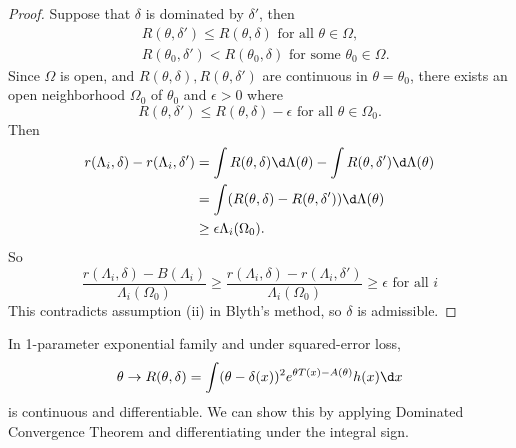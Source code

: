 \documentclass[a4paper]{article}
\begin{document}
\begin{proof}
	Suppose that $\delta$ is dominated by $\delta'$, then
	\begin{equation*}
		\begin{aligned}
			& R(\theta,\delta') \leq R(\theta,\delta) \text{ for all $\theta \in \Omega$}, \\
			& R(\theta_0,\delta') < R(\theta_0,\delta) \text{ for some $\theta_0 \in \Omega$}.
		\end{aligned}
	\end{equation*}
	Since $\Omega$ is open, and $R(\theta,\delta), R(\theta,\delta')$ are continuous in $\theta = \theta_0$, there exists an open neighborhood $\Omega_0$ of $\theta_0$ and $\epsilon > 0$ where
	\begin{equation*}
		R(\theta,\delta') \leq R(\theta,\delta) - \epsilon \text{ for all } \theta \in \Omega_0.
	\end{equation*}
	Then
	\begin{equation*}
		\begin{aligned}
			r(\Lambda_i, \delta) - r(\Lambda_i,\delta') &= \int R(\theta,\delta) \d \Lambda (\theta) - \int R(\theta,\delta') \d \Lambda (\theta) \\
			&= \int (R(\theta,\delta) - R(\theta,\delta')) \d \Lambda (\theta) \\
			&\geq \epsilon \Lambda_i(\Omega_0). \\
		\end{aligned}
	\end{equation*}
	So
	\begin{equation}
		\frac{r(\Lambda_i,\delta) - B(\Lambda_i)}{\Lambda_i(\Omega_0)} \geq \frac{r(\Lambda_i,\delta) - r(\Lambda_i,\delta')}{\Lambda_i(\Omega_0)} \geq \epsilon \text{ for all $i$}
	\end{equation}
	This contradicts assumption (ii) in Blyth's method, so $\delta$ is admissible.
\end{proof}

\begin{remark}
	In 1-parameter exponential family and under squared-error loss,
	\begin{equation*}
		\theta \to R(\theta,\delta) = \int (\theta - \delta(x))^2 e^{\theta T(x) - A(\theta)} h(x) \d x
	\end{equation*}
	is continuous and differentiable. We can show this by applying Dominated Convergence Theorem and differentiating under the integral sign.
\end{remark}
\end{document}

